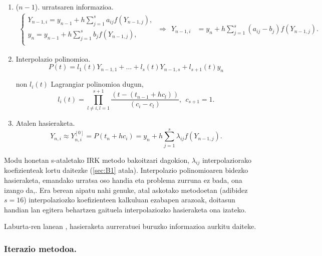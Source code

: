 \begin{enumerate}
\item ($n-1$). urratsaren informazioa.
\begin{align*}
\left \{ \begin{array}{c}
Y_{n-1,i} =y_{n-1}+h \sum\limits_{j=1}^{s} a_{ij} f(Y_{n-1,j}),\\
y_n =y_{n-1}+h \sum\limits_{j=1}^{s} b_j f(Y_{n-1,j}),\\
\end{array} \right.
\ \Rightarrow \ \ 
Y_{n-1,i} &=y_n+h \sum\limits_{j=1}^{s} (a_{ij}-b_j) f(Y_{n-1,j}).
\end{align*}

\item Interpolazio polinomioa.
\begin{equation*}
P(t)=  l_1(t) Y_{n-1,1}+\dots+l_s(t) Y_{n-1,s}+l_{s+1}(t) y_n
\end{equation*}
  
non $l_i(t)$ Lagrangiar polinomioa dugun,
\begin{equation*}
 l_i(t)=\prod_{l\neq i,l=1}^{s+1} \frac{(t-(t_{n-1}+hc_l))}{(c_i-c_l)}, \ \ c_{s+1}=1.
\end{equation*}

\item Atalen hasieraketa.
\begin{equation*}
Y_{n,i} \approx Y_{n,i}^{[0]}= P(t_n+hc_i) = y_n+ h \sum\limits_{j=1}^{s} \lambda_{ij}f(Y_{n-1,j}).
\end{equation*}

\end{enumerate}

Modu honetan s-ataletako IRK metodo bakoitzari dagokion, $\lambda_{ij}$ interpolaziorako koefizienteak lortu daitezke (\ref{sec:B1} atala). Interpolazio polinomioaren bidezko hasieraketa, emandako urratsa oso handia eta problema zurruna ez bada, ona izango da,. Era berean aipatu nahi genuke, atal askotako metodoetan (adibidez $s=16$)  interpolaziozko koefizienteen kalkuluan ezabapen arazoak, doitasun handian lan egitera behartzen gaituela interpolaziozko hasieraketa ona izateko.   

Laburta-ren lanean \cite{Laburta1998}, hasieraketa aurreratuei buruzko informazioa aurkitu daiteke.  


\subsubsection*{Iterazio metodoa.}

